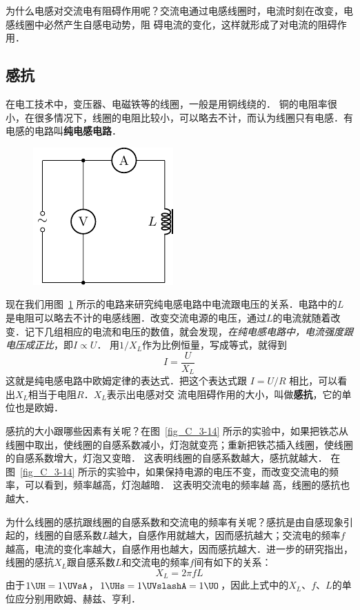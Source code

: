 为什么电感对交流电有阻碍作用呢？交流电通过电感线圈时，电流时刻在改变，电感线圈中必然产生自感电动势，阻
碍电流的变化，这样就形成了对电流的阻碍作用．

\subsection{感抗}

在电工技术中，变压器、电磁铁等的线圈，一般是用铜线绕的．
铜的电阻率很小，在很多情况下，线圈的电阻比较小，可以略去不计，而认为线圈只有电感．有电感的电路叫\textbf{纯电感电路}．
\begin{figure}[htbp]
    \centering
    \includegraphics{fig/C/3-15.pdf}
    \caption{}\label{fig_C_3-15}
\end{figure}
	
现在我们用图~\ref{fig_C_3-15} 所示的电路来研究纯电感电路中电流跟电压的关系．电路中的$L$是电阻可以略去不计的电感线圈．改变交流电源的电压，通过$L$的电流就随着改变．记下几组相应的电流和电压的数值，就会发现，\textit{在纯电感电路中，电流强度跟电压成正比}，即$I\propto U$． 用$1/X_L$作为比例恒量，写成等式，就得到
\[I=\frac{U}{X_L} \]
这就是纯电感电路中欧姆定律的表达式．把这个表达式跟
$I=U/R$
相比，可以看出$X_L$相当于电阻$R$．$X_L$表示出电感对交
流电阻碍作用的大小，叫做\textbf{感抗}，它的单位也是欧姆．

感抗的大小跟哪些因素有关呢？在图~\ref{fig_C_3-14} 所示的实验中，如果把铁芯从线圈中取出，使线圈的自感系数减小，灯泡就变亮；重新把铁芯插入线圈，使线圈的自感系数增大，灯泡又变暗．
这表明线圈的自感系数越大，感抗就越大．
在图~\ref{fig_C_3-14} 所示的实验中，如果保持电源的电压不变，而改变交流电的频率，可以看到，频率越高，灯泡越暗．
这表明交流电的频率越	
高，线圈的感抗也越大．

为什么线圈的感抗跟线圈的自感系数和交流电的频率有关呢？感抗是由自感现象引起的，线圈的自感系数$L$越大，自感作用就越大，因而感抗越大；交流电的频率$f$越高，电流的变化率越大，自感作用也越大，因而感抗越大．进一步的研究指出，线圈的感抗$X_L$跟自感系数$L$和交流电的频率$f$间有如下的关系：
\[X_L=2\pi fL\]
由于$1 \UH=1\UVsA$，$1\UHs=1\UVslashA=1\UO$，因此上式中的$X_L$、$f$、$L$的单位应分别用欧姆、赫兹、亨利．

